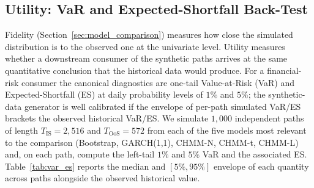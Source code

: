 \subsection{Utility: VaR and Expected-Shortfall Back-Test}
\label{sec:utility}

Fidelity (Section~\ref{sec:model_comparison}) measures how close the simulated distribution is to the observed one at the univariate level.
Utility measures whether a downstream consumer of the synthetic paths arrives at the same quantitative conclusion that the historical data would produce.
For a financial-risk consumer the canonical diagnostics are one-tail Value-at-Risk (VaR) and Expected-Shortfall (ES) at daily probability levels of $1\%$ and $5\%$; the synthetic-data generator is well calibrated if the envelope of per-path simulated VaR/ES brackets the observed historical VaR/ES.
We simulate $1{,}000$ independent paths of length $T_{\text{IS}} = 2{,}516$ and $T_{\text{OoS}} = 572$ from each of the five models most relevant to the comparison (Bootstrap, GARCH(1,1), CHMM-N, CHMM-t, CHMM-L) and, on each path, compute the left-tail $1\%$ and $5\%$ VaR and the associated ES.
Table~\ref{tab:var_es} reports the median and $[5\%, 95\%]$ envelope of each quantity across paths alongside the observed historical value.

